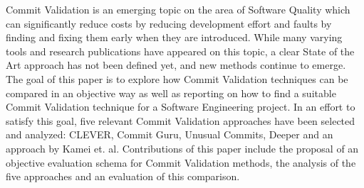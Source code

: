 
Commit Validation is an emerging topic on the area of Software Quality which can significantly reduce costs by reducing development effort and faults by finding and fixing them early when they are introduced. While many varying tools and research publications have appeared on this topic, a clear State of the Art approach has not been defined yet, and new methods continue to emerge. 
The goal of this paper is to explore how Commit Validation techniques can be compared in an objective way as well as reporting on how to find a suitable Commit Validation technique for a Software Engineering project.
In an effort to satisfy this goal, five relevant Commit Validation approaches have been selected and analyzed: CLEVER, Commit Guru, Unusual Commits, Deeper and an approach by Kamei et. al.
Contributions of this paper include the proposal of an objective evaluation schema for Commit Validation methods, the analysis of the five approaches and an evaluation of this comparison.
